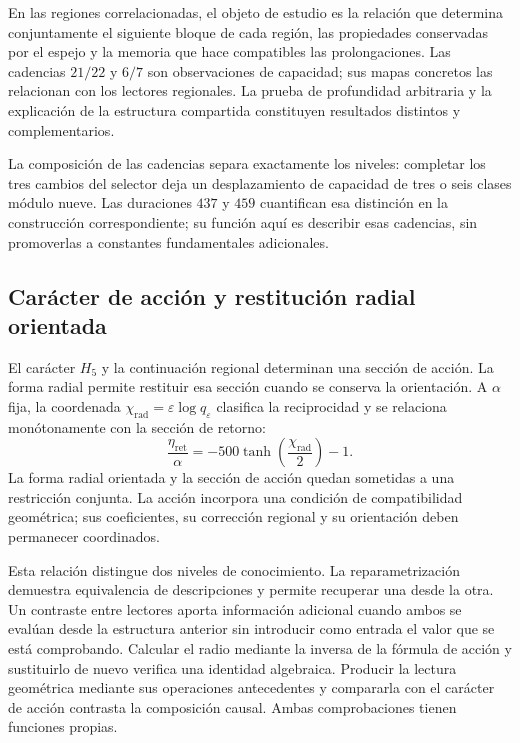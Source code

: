 En las regiones correlacionadas, el objeto de estudio es la relación
que determina conjuntamente el siguiente bloque de cada región, las
propiedades conservadas por el espejo y la memoria que hace compatibles
las prolongaciones. Las cadencias $21/22$ y $6/7$ son observaciones
de capacidad; sus mapas concretos las relacionan con los lectores
regionales. La prueba de profundidad arbitraria y la explicación de
la estructura compartida constituyen resultados distintos y
complementarios.

La composición de las cadencias separa exactamente los niveles:
completar los tres cambios del selector deja un desplazamiento de
capacidad de tres o seis clases módulo nueve. Las duraciones $437$
y $459$ cuantifican esa distinción en la construcción correspondiente;
su función aquí es describir esas cadencias, sin promoverlas a
constantes fundamentales adicionales.

\subsection{Carácter de acción y restitución radial orientada}
\label{md:lectin:h5}

El carácter $H_5$ y la continuación regional determinan una sección
de acción. La forma radial permite restituir esa sección cuando se
conserva la orientación. A $\alpha$ fija, la coordenada
$\chi_{\mathrm{rad}}=\varepsilon\log q_\varepsilon$ clasifica la
reciprocidad y se relaciona monótonamente con la sección de retorno:
\begin{equation}
 \frac{\eta_{\mathrm{ret}}}{\alpha}
 =-500\tanh\!\left(\frac{\chi_{\mathrm{rad}}}{2}\right)-1.
 \label{md:lectin:accion-radial}
\end{equation}
La forma radial orientada y la sección de acción quedan sometidas a
una restricción conjunta. La acción incorpora una condición de
compatibilidad geométrica; sus coeficientes, su corrección regional
y su orientación deben permanecer coordinados.

Esta relación distingue dos niveles de conocimiento. La
reparametrización demuestra equivalencia de descripciones y permite
recuperar una desde la otra. Un contraste entre lectores aporta
información adicional cuando ambos se evalúan desde la estructura
anterior sin introducir como entrada el valor que se está
comprobando. Calcular el radio mediante la inversa de la fórmula de
acción y sustituirlo de nuevo verifica una identidad algebraica.
Producir la lectura geométrica mediante sus operaciones antecedentes
y compararla con el carácter de acción contrasta la composición
causal. Ambas comprobaciones tienen funciones propias.

